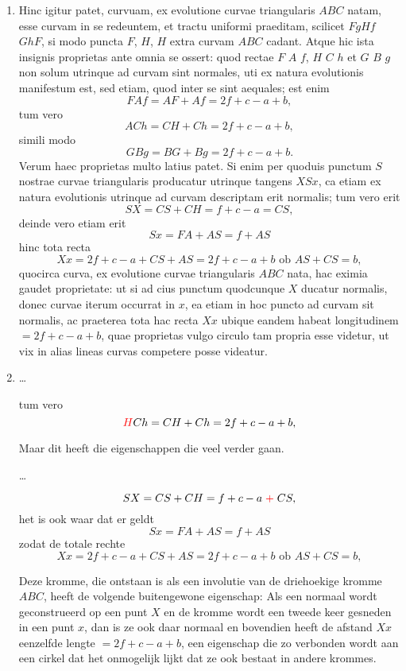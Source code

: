 \documentclass[10pt,a4paper]{article}
\newcommand{\switchenum}{\setcounter{enumi}{\arabic{enumi}-1}\switchcolumn}
\begin{document}
\begin{paracol}{2}
\begin{enumerate}[topsep=1px]
		\switchcolumn*
		
		\item Hinc igitur patet, curvuam, ex evolutione curvae triangularis $ABC$ natam, esse curvam in se redeuntem, et tractu uniformi praeditam, scilicet $F g H f$ $G h F$, si modo puncta $F$, $H$, $H$ extra curvam $ABC$ cadant. Atque hic ista insignis proprietas ante omnia se ossert: quod rectae $F$ $A$ $f$, $H$ $C$ $h$ et $G$ $B$ $g$ non solum utrinque ad curvam sint normales, uti ex natura evolutionis manifestum est, sed etiam, quod inter se sint aequales; est enim
		\[
			F A f = AF + Af = 2f + c - a + b,
		\]
		tum vero
		\[
			A C h = CH + Ch = 2f + c - a + b,
		\]
		simili modo
		\[
			G B g = BG + Bg = 2f + c - a + b.
		\]
		Verum haec proprietas multo latius patet. Si enim per quoduis punctum $S$ nostrae curvae triangularis producatur utrinque tangens $X S x$, ca etiam ex natura evolutionis utrinque ad curvam descriptam erit normalis; tum vero erit
		\[
			SX = CS + CH = f + c - a = CS,
		\]
		deinde vero etiam erit
		\[
			Sx = FA + AS = f + AS
		\]
		hinc tota recta
		\[
			Xx = 2f + c - a + CS + AS = 2f + c - a + b \text{ ob } AS + CS = b,
		\]
		quocirca curva, ex evolutione curvae triangularis $ABC$ nata, hac eximia gaudet proprietate: ut si ad cius punctum quodcunque $X$ ducatur normalis, donec curvae iterum occurrat in $x$, ea etiam in hoc puncto ad curvam sit normalis, ac praeterea tota hac recta $Xx$ ubique eandem habeat longitudinem $= 2f +c-a+b$, quae proprietas vulgo circulo tam propria esse videtur, ut vix in alias lineas curvas competere posse videatur.
		
		\switchenum
		\item \ldots
		
		\par tum vero
		\[
			{\color{red}H} C h = CH + Ch = 2f + c - a + b,
		\]
		
		\par Maar dit heeft die eigenschappen die veel verder gaan. 
		\par \ldots
		
		\[
			SX = CS + CH = f + c - a {\color{red}\;+\;} CS,
		\]
		het is ook waar dat er geldt
		\[
			Sx = FA + AS = f + AS
		\]
		zodat de totale rechte
		\[
			Xx = 2f + c - a + CS + AS = 2f + c - a + b \text{ ob } AS + CS = b,
		\]
		\par Deze kromme, die ontstaan is als een involutie van de driehoekige kromme $ABC$, heeft de volgende buitengewone eigenschap: Als een normaal wordt geconstrueerd op een punt $X$ en de kromme wordt een tweede keer gesneden in een punt $x$, dan is ze ook daar normaal en bovendien heeft de afstand $Xx$ eenzelfde lengte $= 2f+c-a+b$, een eigenschap die zo verbonden wordt aan een cirkel dat het onmogelijk lijkt dat ze ook bestaat in andere krommes.
		

\end{enumerate}
\end{paracol}
\end{document}
